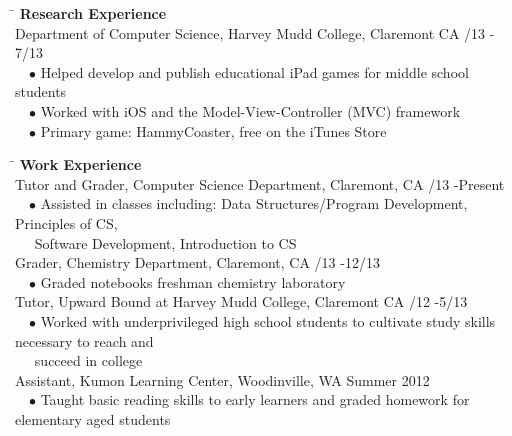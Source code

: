 \documentclass[11.5pt]{article}
\newcommand{\sectionNL}{\\[2pt]}
\newcommand{\customtab}{$\hspace{10pt}\bullet\hspace{2pt}$}
\newcommand{\customtabinline}{$\hspace{17pt}$}
\begin{document}
\begin{tabbing} 
\hspace*{6.5in}\= \kill
{\large \textbf{Research Experience} } \> \sectionNL
Department of Computer Science, Harvey Mudd College, Claremont CA /13 - 7/13 \\
\customtab Helped develop and publish educational iPad games for middle school students \\
\customtab Worked with iOS and the Model-View-Controller (MVC) framework \\
\customtab Primary game: HammyCoaster, free on the iTunes Store
\end{tabbing}
	
\begin{tabbing} 
\hspace*{6.5in}\= \kill
{\large \textbf{Work Experience} } \> \sectionNL
Tutor and Grader, Computer Science Department, Claremont, CA /13 -Present \\
\customtab Assisted in classes including: Data Structures/Program Development, Principles of CS,\\ \customtabinline Software Development,  Introduction to CS\\ 
\newline
Grader, Chemistry Department, Claremont, CA /13 -12/13 \\
\customtab Graded notebooks freshman chemistry laboratory \\
Tutor, Upward Bound at Harvey Mudd College, Claremont CA  /12 -5/13 \\

\customtab Worked with underprivileged high school students to cultivate study skills necessary to reach and \\ \customtabinline succeed in college \\

Assistant, Kumon Learning Center, Woodinville, WA \>Summer 2012 \\
\customtab Taught basic reading skills to early learners and graded homework for elementary aged students
\end{tabbing}
\end{document}
